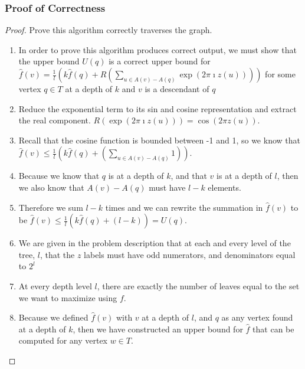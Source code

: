 \documentclass{article}
\begin{document}
\subsubsection{Proof of Correctness}
\begin{proof} Prove this algorithm correctly traverses the graph.
      \begin{enumerate}
            \item In order to prove this algorithm produces correct output, we must show
                  that the upper bound \(U(q)\) is a correct upper bound for \(\hat{f}(v)
                  = \frac{1}{l} (k \hat{f}(q) + R (\sum_{u\in A(v) - A(q)} \exp{(2 \pi
                        \imath z (u))}))\) for some vertex \(q \in T\) at a depth of \(k\) and
                  \(v\) is a descendant of \(q\)
            \item Reduce the exponential term to its sin and cosine representation and
                  extract the real component. \(R(\exp (2 \pi \imath z(u))) = \cos{(2 \pi z
                        (u))}\).
            \item Recall that the cosine function is bounded between -1 and 1, so we know
                  that \(\hat{f}(v) \leq \frac{1}{l} (k \hat{f}(q) + (\sum_{u \in A(v) -
                        A(q)} 1))\).
            \item Because we know that \(q\) is at a depth of \(k\), and that \(v\) is at
                  a depth of \(l\), then we also know that \(A(v) - A(q)\) must have \(l -
                  k\) elements.
            \item Therefore we sum \(l-k\) times and we can rewrite the summation in
                  \(\hat{f}(v)\) to be \( \hat{f}(v) \leq \frac{1}{l} (k \hat{f} (q) +
                  (l-k)) = U(q) \).
            \item We are given in the problem description that at each and every level of
                  the tree, \(l\), that the \(z\) labels must have odd numerators, and
                  denominators equal to \(2^l\)
            \item At every depth level \(l\), there are exactly the number of leaves equal
                  to the set we want to maximize using \(f\).
            \item Because we defined \(\hat{f}(v)\) with \(v\) at a depth of \(l\), and
                  \(q\) as any vertex found at a depth of \(k\), then we have constructed
                  an upper bound for \(\hat{f}\) that can be computed for any vertex \(w
                  \in T\).

\end{enumerate}
\end{proof}
\end{document}
